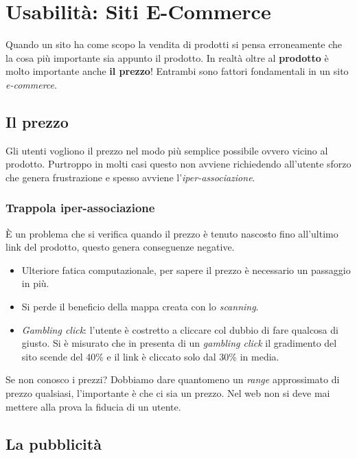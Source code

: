 
\chapter{Usabilità: Siti E-Commerce}
	Quando un sito ha come scopo la vendita di prodotti si pensa erroneamente che la cosa più importante sia appunto il prodotto. In realtà oltre al \textbf{prodotto} è molto importante anche \textbf{il prezzo}! Entrambi sono fattori fondamentali in un sito \emph{e-commerce}.

	\section{Il prezzo}
		Gli utenti vogliono il prezzo nel modo più semplice possibile ovvero vicino al prodotto. Purtroppo in molti casi questo non avviene richiedendo all'utente sforzo che genera frustrazione e spesso avviene l'\emph{iper-associazione}.
	
		\subsection{Trappola iper-associazione}
			È un problema che si verifica quando il prezzo è tenuto nascosto fino all'ultimo link del prodotto, questo genera conseguenze negative.
			\begin{itemize}
				\item Ulteriore fatica computazionale, per sapere il prezzo è necessario un passaggio in più.
				\item Si perde il beneficio della mappa creata con lo \emph{scanning}.
				\item \emph{Gambling click}: l'utente è costretto a cliccare col dubbio di fare qualcosa di giusto. Si è misurato che in presenta di un \emph{gambling click} il gradimento del sito scende del 40\% e il link è cliccato solo dal 30\% in media.
			\end{itemize}
			Se non conosco i prezzi? Dobbiamo dare quantomeno un \emph{range} approssimato di prezzo qualsiasi, l'importante è che ci sia un prezzo. Nel web non si deve mai mettere alla prova la fiducia di un utente.
	
	\section{La pubblicità}
		
